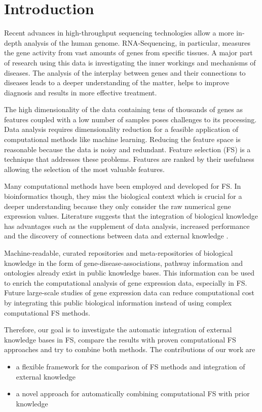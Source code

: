 \chapter{Introduction}
\label{chapter:introduction}

Recent advances in high-throughput sequencing technologies allow a more in-depth analysis of the human genome. 
RNA-Sequencing, in particular, measures the gene activity from vast amounts of genes from specific tissues\cite{kukurba2015rna}.
A major part of research using this data is investigating the inner workings and mechanisms of diseases. 
The analysis of the interplay between genes and their connections to diseases leads to a deeper understanding of the matter, helps to improve diagnosis and results in more effective treatment\cite{soh2007enabling}.

The high dimensionality of the data containing tens of thousands of genes as features coupled with a low number of samples poses challenges to its processing. 
Data analysis requires dimensionality reduction for a feasible application of computational methods like machine learning. 
Reducing the feature space is reasonable because the data is noisy and redundant\cite{ang2016supervised}.
Feature selection (FS) is a technique that addresses these problems. 
Features are ranked by their usefulness allowing the selection of the most valuable features. 

Many computational methods have been employed and developed for FS.
In bioinformatics though, they miss the biological context which is crucial for a deeper understanding because they only consider the raw numerical gene expression values. 
Literature suggests that the integration of biological knowledge has advantages such as the supplement of data analysis, increased performance and the discovery of connections between data and external knowledge \cite{bellazzi2007towards}.

Machine-readable, curated repositories and meta-repositories of biological knowledge in the form of gene-disease-associations, pathway information and ontologies already exist in public knowledge bases\cite{ashburner2000gene,gene2016expansion,kanehisa2000kegg,pinero2015disgenet}. 
This information can be used to enrich the computational analysis of gene expression data, especially in FS. 
Future large-scale studies of gene expression data can reduce computational cost by integrating this public biological information instead of using complex computational FS methods.

Therefore, our goal is to investigate the automatic integration of external knowledge bases in FS, compare the results with proven computational FS approaches and try to combine both methods. 
The contributions of our work are
\begin{itemize}
\item a flexible framework for the comparison of FS methods and integration of external knowledge
\item a novel approach for automatically combining computational FS with prior knowledge
\end{itemize}

